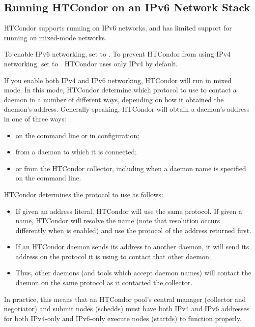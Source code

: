 \subsection{\label{sec:ipv6}Running HTCondor on an IPv6 Network Stack}

HTCondor supports running on IPv6 networks, and has limited support for
running on mixed-mode networks.

To enable IPv6 networking, set  to .  To
prevent HTCondor from using IPv4 networking, set  to
.  HTCondor uses only IPv4 by default.

If you enable both IPv4 and IPv6 networking, HTCondor will run in mixed
mode.  In this mode, HTCondor determine which protocol to use to contact
a daemon in a number of different ways, depending on how it obtained the
daemon's address.  Generally speaking, HTCondor will obtain a daemon's
address in one of three ways:

\begin{itemize}
\item{on the command line or in configuration;}
\item{from a daemon to which it is connected;}
\item{or from the HTCondor collector, including when a daemon name is specified on the command line.}
\end{itemize}

HTCondor determines the protocol to use as follows:

\begin{itemize}
\item{If given an address literal, HTCondor will use the same protocol.  If
given a name, HTCondor will resolve the name (note that resolution occurs
differently when  is enabled) and use the protocol of the address
returned first.}
\item{If an HTCondor daemon sends its address to another daemon, it will send
its address on the protocol it is using to contact that other daemon.}
\item{Thus, other daemons (and tools which accept daemon names) will contact the
daemon on the same protocol as it contacted the collector.}
\end{itemize}

In practice, this means that an HTCondor pool's central manager (collector
and negotiator) and submit nodes (schedds) must have both IPv4 and IPv6
addresses for both IPv4-only and IPv6-only execute nodes (startds) to
function properly.

